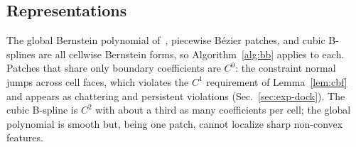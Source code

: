 \documentclass[journal]{IEEEtran}
\theoremstyle{definition}
\begin{document}
\subsection{Representations}\label{sec:repr}
The global Bernstein polynomial of~\cite{jo2026geometry}, piecewise B\'ezier patches, and cubic
B-splines are all cellwise Bernstein forms, so Algorithm~\ref{alg:bb} applies to each. Patches that
share only boundary coefficients are $C^0$: the constraint normal jumps across cell faces, which
violates the $C^1$ requirement of Lemma~\ref{lem:cbf} and appears as chattering and persistent
violations (Sec.~\ref{sec:exp-dock}). The cubic B-spline is $C^2$ with about a third as
many coefficients per cell; the global polynomial is smooth but, being one patch, cannot localize
sharp non-convex features.

\end{document}
